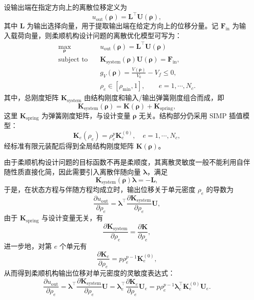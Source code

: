 设输出端在指定方向上的离散位移定义为
\[
u_{\text{out}}(\boldsymbol{\rho}) = \boldsymbol{L}^{\top}\boldsymbol{U}(\boldsymbol{\rho}),
\]
其中 $\boldsymbol{L}$ 为输出选择向量，用于提取输出端在给定方向上的位移分量。记 $\boldsymbol{F}_{\text{in}}$ 为输入载荷向量，则柔顺机构设计问题的离散优化模型可写为：
\begin{equation} \label{eq:ch3_discrete_model_mechanism}
	\begin{aligned}
		\max_{\boldsymbol{\rho}}\quad & u_{\text{out}}(\boldsymbol{\rho}) = \boldsymbol{L}^{\top}\boldsymbol{U}(\boldsymbol{\rho})\\
		\text{subject to}\quad & \boldsymbol{K}_{\text{system}}(\boldsymbol{\rho})\boldsymbol{U}(\boldsymbol{\rho}) = \boldsymbol{F}_{\text{in}},\\
		& g_V(\boldsymbol{\rho}) = \frac{V(\boldsymbol{\rho})}{V_0} - V_f\leq 0,\\ 
		& \rho_e\in[\rho_{\min},1],\qquad e=1,\cdots,N_c. 
	\end{aligned}
\end{equation}
其中，总刚度矩阵 $\boldsymbol{K}_{\text{system}}$ 由结构刚度和输入/输出弹簧刚度组合而成，即
\[
\boldsymbol{K}_{\text{system}}(\boldsymbol{\rho}) = \boldsymbol{K}(\boldsymbol{\rho}) + \boldsymbol{K}_{\text{spring}},
\]
这里 $\boldsymbol{K}_{\text{spring}}$ 为弹簧刚度矩阵，与设计变量 $\boldsymbol{\rho}$ 无关。结构部分仍采用 SIMP 插值模型：
\[
\boldsymbol{K}_e(\rho_e) = \rho_e^p\boldsymbol{K}_e^{(0)},\quad e=1,\cdots,N_c,
\]
经标准有限元装配后得到全局结构刚度矩阵 $\boldsymbol{K}(\boldsymbol{\rho})$。

由于柔顺机构设计问题的目标函数不再是柔顺度，其离散灵敏度一般不能利用自伴随性质直接化简，因此需要引入离散伴随向量 $\boldsymbol{\lambda}$，满足
\[
\boldsymbol{K}_{\text{system}}(\boldsymbol{\rho})\boldsymbol{\lambda} = -\boldsymbol{L},
\]
于是，在状态方程与伴随方程均成立时，输出位移关于单元密度 $\rho_e$ 的导数为
\[
\frac{\partial u_{\text{out}}}{\partial \rho_e}  = \boldsymbol{\lambda}^{\top} \frac{\partial \boldsymbol{K}_{\text{system}}}{\partial \rho_e} \boldsymbol{U},
\]
由于 $\boldsymbol{K}_{\text{spring}}$ 与设计变量无关，有
\[
\frac{\partial\boldsymbol{K}_{\text{system}}}{\partial \rho_e} = \frac{\partial\boldsymbol{K}}{\partial \rho_e},
\]
进一步地，对第 $e$ 个单元有
\[
\frac{\partial\boldsymbol{K}_e}{\partial \rho_e} = p\rho_e^{p-1}\boldsymbol{K}_e^{(0)},
\]
从而得到柔顺机构输出位移对单元密度的灵敏度表达式：
\begin{equation} \label{eq:ch3_sens_mechanism}
	\frac{\partial u_{\text{out}}}{\partial \rho_e} = \boldsymbol{\lambda}^{\top} \frac{\partial \boldsymbol{K}_{\text{system}}}{\partial \rho_e} \boldsymbol{U} = \boldsymbol{\lambda}_e^{\top}\frac{\partial\boldsymbol{K}_e}{\partial\rho_e}\boldsymbol{U}_e = p\rho_e^{p-1} \boldsymbol{\lambda}_e^{\top} \boldsymbol{K}_e^{(0)} \boldsymbol{U}_e.
\end{equation}

